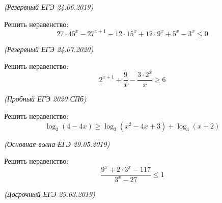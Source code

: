 \begin{class}[number=3]
\begin{listofex}
		\begin{flushright}
			\textit{(Резервный ЕГЭ 24.06.2019)}
		\end{flushright}
		\item Решить неравенство:
		\[ 27\cdot45^x-27^{x+1}-12\cdot15^x+12\cdot9^x+5^x-3^x\le0 \]
		\begin{flushright}
			\textit{(Резервный ЕГЭ 24.07.2020)}
		\end{flushright}
		\item Решить неравенство:
		\[ 2^{x+1}+\dfrac{9}{x}-\dfrac{3\cdot2^x}{x}\ge6 \]
		\begin{flushright}
			\textit{(Пробный ЕГЭ 2020 СПб)}
		\end{flushright}
		\item Решить неравенство:
		\[ \log_3(4-4x)\ge\log_3(x^2-4x+3)+\log_3(x+2) \]
		\begin{flushright}
			\textit{(Основная волна ЕГЭ 29.05.2019)}
		\end{flushright}
		\item Решить неравенство:
		\[ \dfrac{9^x+2\cdot3^x-117}{3^x-27}\le1 \]
		\begin{flushright}
			\textit{(Досрочный ЕГЭ 29.03.2019)}
		\end{flushright}
	\end{listofex}
\end{class}

